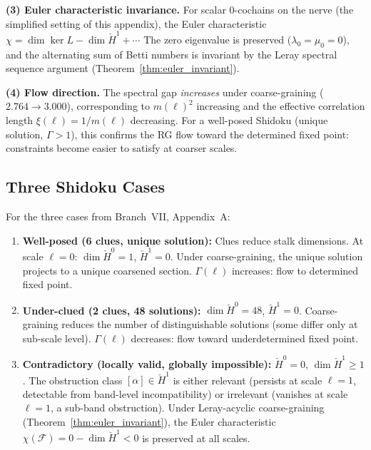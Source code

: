 \documentclass[11pt,letterpaper]{article}
\newcommand{\Hcech}{\check{H}}
\newcommand{\sheaf}{\mathcal{F}}
\begin{document}
\textbf{(3) Euler characteristic invariance.} For scalar 
0-cochains on the nerve (the simplified setting of this appendix), 
the Euler characteristic $\chi = \dim \ker L - \dim \Hcech^1 
+ \cdots$ The zero eigenvalue is preserved 
($\lambda_0 = \mu_0 = 0$), and the alternating sum of Betti 
numbers is invariant by the Leray spectral sequence argument 
(Theorem~\ref{thm:euler_invariant}).

\textbf{(4) Flow direction.} The spectral gap \emph{increases} 
under coarse-graining ($2.764 \to 3.000$), corresponding to 
$m(\ell)^2$ increasing and the effective correlation length 
$\xi(\ell) = 1/m(\ell)$ decreasing. For a well-posed Shidoku 
(unique solution, $\Gamma > 1$), this confirms the RG flow toward 
the determined fixed point: constraints become easier to satisfy at 
coarser scales.

\subsection{Three Shidoku Cases}

For the three cases from Branch~VII, Appendix~A:

\begin{enumerate}
    \item \textbf{Well-posed (6 clues, unique solution):} Clues 
    reduce stalk dimensions. At scale $\ell = 0$: 
    $\dim \Hcech^0 = 1$, $\Hcech^1 = 0$. Under coarse-graining, 
    the unique solution projects to a unique coarsened section. 
    $\Gamma(\ell)$ increases: flow to determined fixed point.
    
    \item \textbf{Under-clued (2 clues, 48 solutions):} 
    $\dim \Hcech^0 = 48$, $\Hcech^1 = 0$. Coarse-graining reduces 
    the number of distinguishable solutions (some differ only at 
    sub-scale level). $\Gamma(\ell)$ decreases: flow toward 
    underdetermined fixed point.
    
    \item \textbf{Contradictory (locally valid, globally 
    impossible):} $\Hcech^0 = 0$, $\dim \Hcech^1 \geq 1$. The 
    obstruction class $[\alpha] \in \Hcech^1$ is either relevant 
    (persists at scale $\ell = 1$, detectable from band-level 
    incompatibility) or irrelevant (vanishes at scale $\ell = 1$, 
    a sub-band obstruction). Under Leray-acyclic coarse-graining 
    (Theorem~\ref{thm:euler_invariant}), the Euler characteristic 
    $\chi(\sheaf) = 0 - \dim \Hcech^1 < 0$ is preserved at all 
    scales.
\end{enumerate}
\end{document}
